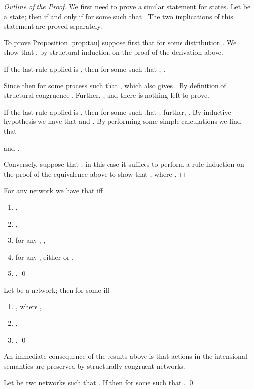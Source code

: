 \documentclass{LMCS}
\begin{document}
\begin{proof}[Outline of the Proof]
We first need to prove a similar statement for states. 
Let  be a state; then  if and 
only if  for some  such that 
. The two implications 
of this statement are proved separately. 



To prove Proposition \ref{prop:tau} suppose first 
that  for 
some distribution . We show that 
,  
by structural induction on the proof of the derivation above. 

If the last rule applied is , then  
for some  such that  , . 

Since  then  for some 
process  such that , which also gives 
. 
By definition of structural congruence . Further, , and there 
is nothing left to prove.

If the last rule applied is , then 
 for some  such that 
; further, . 
By inductive hypothesis we have that  
and . 
By performing some simple calculations we find that 
 
and .

Conversely, suppose that ; in 
this case it suffices to perform a rule induction on the proof of 
the equivalence above to show that , where .
\end{proof}

\begin{prop}[Input]
\label{prop:input}
For any network  we have that 
 iff
\begin{enumerate}[label=(\roman*)]
\item , 
\item , 
\item for any , , 
\item for any , either  
or , 
\item .
\qed
\end{enumerate}

\end{prop}

\begin{prop}[Broadcast]
\label{prop:broadcast}
Let  be a network; then  for some  iff 
\begin{enumerate}[label=(\roman*)]
\item , 
where , 
\item , 
\item .
\qed
\end{enumerate}

\end{prop}

\noindent An immediate consequence of the results above is 
that actions in the intensional semantics 
are preserved by structurally congruent networks.
\begin{cor}
\label{cor:reduction}
Let  be two networks 
such that . 
If  then 
 for some 
 such that .
\qed
\end{cor}
\end{document}
